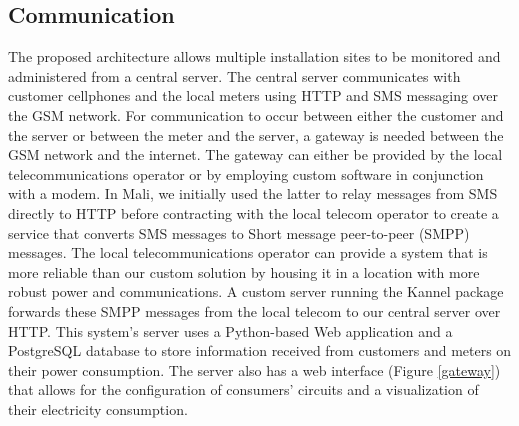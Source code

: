 \documentclass{sig-alternate}
\begin{document}
\subsection{Communication}
The proposed architecture allows multiple installation sites to be
monitored and administered from a central server.
The central server communicates with customer cellphones and the
local meters using HTTP and SMS messaging over the GSM
network.
For communication to occur between either the customer and the server
or between the meter and the server, a gateway is needed between
the GSM network and the internet.
The gateway can either be provided by the local telecommunications operator
or by employing custom software in conjunction with a modem.
In Mali, we initially used the latter to relay messages from SMS
directly to HTTP before contracting with the local telecom operator to
create a service that converts SMS messages to Short message
peer-to-peer (SMPP) messages.
The local telecommunications operator can provide a system that is
more reliable than our custom solution by housing it in a 
location with more robust power and communications.
A custom server running the Kannel package forwards
these SMPP messages from the local telecom to our central server over HTTP.
This system's server uses a Python-based Web application and a
PostgreSQL database to store information received from customers and
meters on their power consumption.
The server also has a web interface (Figure \ref{gateway}) that allows for
the configuration of consumers' circuits and a visualization of their
electricity consumption.
\end{document}
